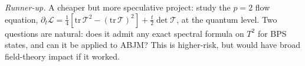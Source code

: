 \documentclass[11pt]{article}
\begin{document}
\emph{Runner-up.} A cheaper but more speculative project: study the $p=2$ flow equation, $\partial_t\mathcal L=\tfrac14[\mathrm{tr}\,\mathcal T^2-(\mathrm{tr}\,\mathcal T)^2]+\tfrac t2\det\mathcal T$, at the quantum level. Two questions are natural: does it admit any exact spectral formula on $T^2$ for BPS states, and can it be applied to ABJM? This is higher-risk, but would have broad field-theory impact if it worked.
\end{document}
